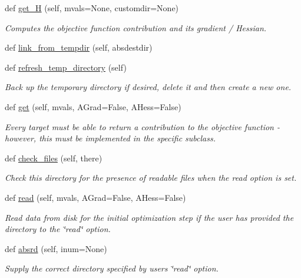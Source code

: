 \begin{DoxyCompactItemize}
def \hyperlink{classsrc_1_1target_1_1Target_adae73b394ec5a1c22fe57d90265de537}{get\+\_\+H} (self, mvals=None, customdir=None)
\begin{DoxyCompactList}\small\item\em Computes the objective function contribution and its gradient / Hessian. \end{DoxyCompactList}\item 
def \hyperlink{classsrc_1_1target_1_1Target_a558b52b23367b475a553567cd3ab5a8f}{link\+\_\+from\+\_\+tempdir} (self, absdestdir)
\item 
def \hyperlink{classsrc_1_1target_1_1Target_ad8126429a9b72dff627da96934cd7f5c}{refresh\+\_\+temp\+\_\+directory} (self)
\begin{DoxyCompactList}\small\item\em Back up the temporary directory if desired, delete it and then create a new one. \end{DoxyCompactList}\item 
def \hyperlink{classsrc_1_1target_1_1Target_a8cdd102607c4ed610c0e1ec50e91452d}{get} (self, mvals, A\+Grad=False, A\+Hess=False)
\begin{DoxyCompactList}\small\item\em Every target must be able to return a contribution to the objective function -\/ however, this must be implemented in the specific subclass. \end{DoxyCompactList}\item 
def \hyperlink{classsrc_1_1target_1_1Target_ab38c76271f96279624e9981bc365a082}{check\+\_\+files} (self, there)
\begin{DoxyCompactList}\small\item\em Check this directory for the presence of readable files when the \textquotesingle{}read\textquotesingle{} option is set. \end{DoxyCompactList}\item 
def \hyperlink{classsrc_1_1target_1_1Target_ae3ca02da2e52ece9a6f8d48203cc245e}{read} (self, mvals, A\+Grad=False, A\+Hess=False)
\begin{DoxyCompactList}\small\item\em Read data from disk for the initial optimization step if the user has provided the directory to the \char`\"{}read\char`\"{} option. \end{DoxyCompactList}\item 
def \hyperlink{classsrc_1_1target_1_1Target_ad4a6e0bee35444a8b2c8bc124aac3c46}{absrd} (self, inum=None)
\begin{DoxyCompactList}\small\item\em Supply the correct directory specified by user\textquotesingle{}s \char`\"{}read\char`\"{} option. \end{DoxyCompactList}\item 

\end{DoxyCompactItemize}

